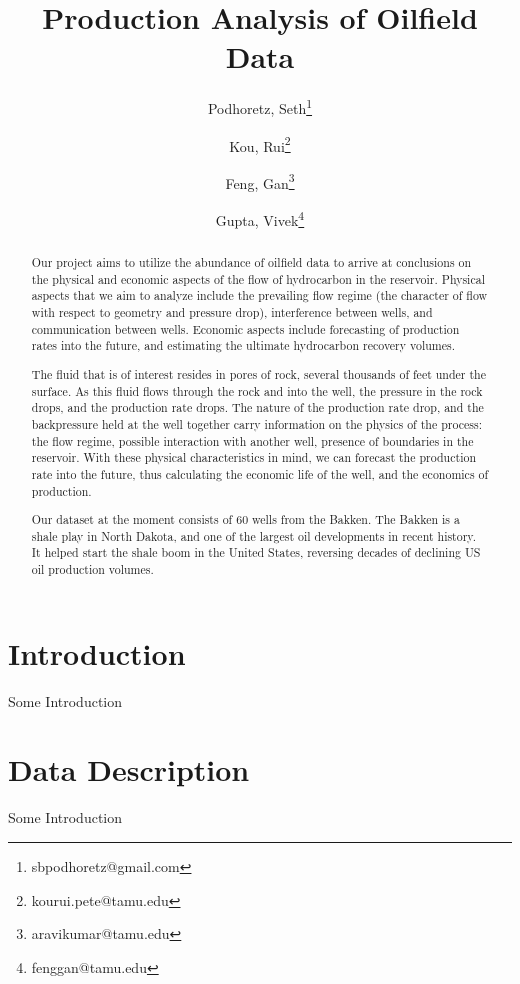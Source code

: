 \documentclass[a4paper]{article}
\title{Production Analysis of Oilfield Data}
\author{Podhoretz, Seth\thanks{sbpodhoretz@gmail.com}}
\author{Kou, Rui\thanks{kourui.pete@tamu.edu}}
\author{Feng, Gan\thanks{aravikumar@tamu.edu}}
\author{Gupta, Vivek\thanks{fenggan@tamu.edu}}
\affil{Department of Statistics, Texas A \& M University}
\begin{document}
	\maketitle
\begin{abstract}
	Our project aims to utilize the abundance of oilfield data to arrive at conclusions on the physical and
	economic aspects of the flow of hydrocarbon in the reservoir. Physical aspects that we aim to analyze include
	the prevailing flow regime (the character of flow with respect to geometry and pressure drop), interference
	between wells, and communication between wells. Economic aspects include forecasting of production rates
	into the future, and estimating the ultimate hydrocarbon recovery volumes.
	
	
	The fluid that is of interest resides in pores of rock, several thousands of feet under the surface. As this
	fluid flows through the rock and into the well, the pressure in the rock drops, and the production rate drops.
	The nature of the production rate drop, and the backpressure held at the well together carry information on
	the physics of the process: the flow regime, possible interaction with another well, presence of boundaries
	in the reservoir. With these physical characteristics in mind, we can forecast the production rate into the
	future, thus calculating the economic life of the well, and the economics of production.
	
	
	Our dataset at the moment consists of 60 wells from the Bakken. The Bakken is a shale play in North
	Dakota, and one of the largest oil developments in recent history. It helped start the shale boom in the
	United States, reversing decades of declining US oil production volumes. 
\end{abstract}

\section{Introduction}
 Some Introduction
 
\section{Data Description}
 Some Introduction
\end{document}
